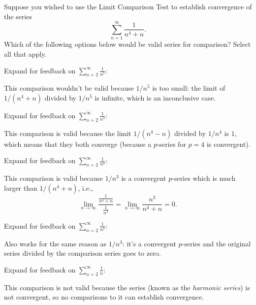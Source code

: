 \documentclass{ximera}
\begin{document}

\begin{exercise}
Suppose you wished to use the Limit Comparison Test to establish convergence of the series
\[ \sum_{n=1}^\infty \frac{1}{n^4 + n}. \]
Which of the following options below would be valid series for comparison? Select all that apply.
\begin{selectAll}
\end{selectAll}
\begin{feedback}
Expand for feedback on {$\displaystyle \sum_{n=2}^\infty \frac{1}{n^5}$}:
\begin{expandable}
This comparison wouldn't be valid because $1/n^5$ is too small: the limit of $1/(n^4+n)$ divided by $1/n^5$ is infinite, which is an inconclusive case.
\end{expandable}

Expand for feedback on {$\displaystyle \sum_{n=2}^\infty \frac{1}{n^4}$}:
\begin{expandable}
This comparison is valid because the limit $1/(n^4-n)$ divided by $1/n^4$ is $1$, which means that they both converge (because a $p$-series for $p=4$ is convergent).
\end{expandable}

Expand for feedback on {$\displaystyle \sum_{n=2}^\infty \frac{1}{n^3}$}:
\begin{expandable}
This comparison is valid because $1/n^3$ is a convergent $p$-series which is much larger than $1/(n^4+n)$, i.e.,
\[ \lim_{n \rightarrow \infty} \frac{\frac{1}{n^4+n}}{\frac{1}{n^3}} = \lim_{n \rightarrow \infty} \frac{n^3}{n^4+n} = 0. \]
\end{expandable}

Expand for feedback on {$\displaystyle \sum_{n=2}^\infty \frac{1}{n^2}$}:
\begin{expandable}
Also works for the same reason as $1/n^3$: it's a convergent $p$-series and the original series divided by the comparison series goes to zero.
\end{expandable}

Expand for feedback on {$\displaystyle \sum_{n=2}^\infty \frac{1}{n}$}:
\begin{expandable}
This comparison is not valid because the series (known as the \textit{harmonic series}) is not convergent, so no comparisons to it can establish convergence.
\end{expandable}
\end{feedback}
\end{exercise}
\end{document}
